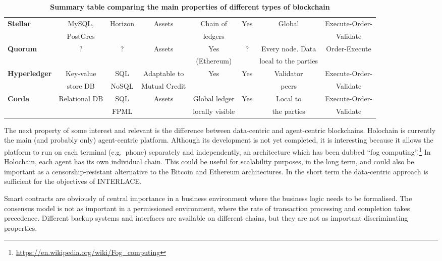 \begin{table}
\begin{centering}
{\begin{tabular}{| l | c | c | c | c | c | c | c |}
\textbf{Stellar}		&MySQL,		&Horizon			&Assets
				&Chain of		&Yes				&Global			&Execute-Order-\\
				&PostGres	&				&
				&ledgers		&				&				&Validate\\
\hline
\textbf{Quorum} 	&?			&?				&Assets
				&Yes			&?				&Every node. Data	&Order-Execute\\
			 	&			&				&
				&(Ethereum) 	&				&local to the parties		& \\
\hline
\textbf{Hyperledger}	&Key-value	&SQL			&Adaptable to
				&Yes			&Yes				&Validator				&Execute-Order-\\
 				&store DB		&NoSQL			&Mutual Credit
				&			&				&peers				&Validate \\
\hline
\textbf{Corda} 		&Relational DB	&SQL			&Assets
				&Global ledger	&Yes				&Local to				&Execute-Order-\\
		 		&			&FPML			&
				&locally visible 	&				&the parties			&Validate \\
\hline
\end{tabular}}
\caption{\bf \small Summary table comparing the main properties of different types of blockchain}
\label{blockchain_types1}
\end{centering}
\end{table}

The next property of some interest and relevant is the difference between data-centric and agent-centric blockchains. Holochain is currently the main (and probably only) agent-centric platform. Although its development is not yet completed, it is interesting because it allows the platform to run on each terminal (e.g.\ phone) separately and independently, an architecture which has been dubbed ``fog computing''.\footnote{\url{https://en.wikipedia.org/wiki/Fog_computing}} In Holochain, each agent has its own individual chain. This could be useful for scalability purposes, in the long term, and could also be important as a censorship-resistant alternative to the Bitcoin and Ethereum architectures. In the short term the data-centric approach is sufficient for the objectives of INTERLACE.

Smart contracts are obviously of central importance in a business environment where the business logic needs to be formalised. The consensus model is not as important in a permissioned environment, where the rate of transaction processing and completion takes precedence. Different backup systems and interfaces are available on different chains, but they are not as important discriminating properties.

